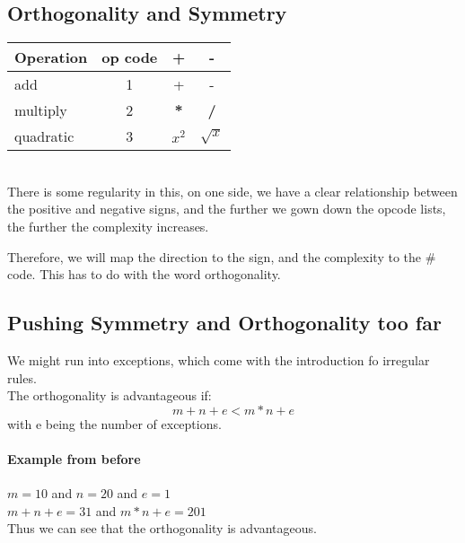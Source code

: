      \subsection{Orthogonality and Symmetry}
     \begin{center}
        \begin{tabular}{l|ccc}
            Operation & op code & + & -\\
            \midrule
            add & 1 & + & -\\
            multiply & 2 & \textbf{*} & \textbf{/}\\
            quadratic & 3 & \textbf{$x^2$} & \textbf{$\sqrt{x}$}\\
        \end{tabular}\\
        There is some regularity in this, on one side, we have a clear relationship between the positive and negative signs, and the further we gown down the opcode lists, the further the complexity increases. \\
     \end{center}
     Therefore, we will map the direction to the sign, and the complexity to the \# code. This has to do with the word orthogonality.\\
     
     \subsection{Pushing Symmetry and Orthogonality too far}
     We might run into exceptions, which come with the introduction fo irregular rules.\\
     The orthogonality is advantageous if:
     \begin{equation}
        m + n + e < m*n + e
     \end{equation}
     with e being the number of exceptions.
     \paragraph{Example from before}
     $ m = 10$ and $n = 20$ and $e = 1$\\
        $m + n + e = 31$ and $m*n + e = 201$\\
    Thus we can see that the orthogonality is advantageous.\\

